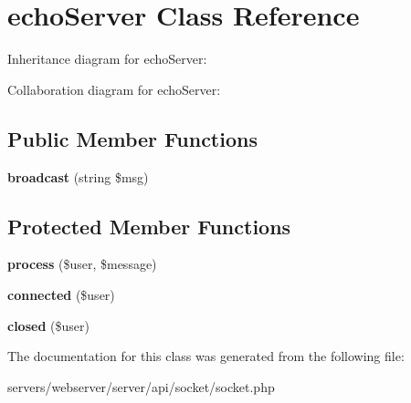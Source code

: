 \hypertarget{class_lora_1_1_api_1_1echo_server}{}\section{echo\+Server Class Reference}
\label{class_lora_1_1_api_1_1echo_server}


Inheritance diagram for echo\+Server\+:


Collaboration diagram for echo\+Server\+:
\subsection*{Public Member Functions}
\begin{DoxyCompactItemize}
\item 
\mbox{\label{class_lora_1_1_api_1_1echo_server_a473114c92843eda7de537f42ffde8913}} 
{\bfseries broadcast} (string \$msg)
\end{DoxyCompactItemize}
\subsection*{Protected Member Functions}
\begin{DoxyCompactItemize}
\item 
\mbox{\label{class_lora_1_1_api_1_1echo_server_a805b6933fa0b69978e35fe94f3884de7}} 
{\bfseries process} (\$user, \$message)
\item 
\mbox{\label{class_lora_1_1_api_1_1echo_server_a3e89014762456a67edbe843811c78736}} 
{\bfseries connected} (\$user)
\item 
\mbox{\label{class_lora_1_1_api_1_1echo_server_aaf6375ec8ee41584a5adcf3d85d73018}} 
{\bfseries closed} (\$user)
\end{DoxyCompactItemize}


The documentation for this class was generated from the following file\+:\begin{DoxyCompactItemize}
\item 
servers/webserver/server/api/socket/socket.\+php\end{DoxyCompactItemize}
